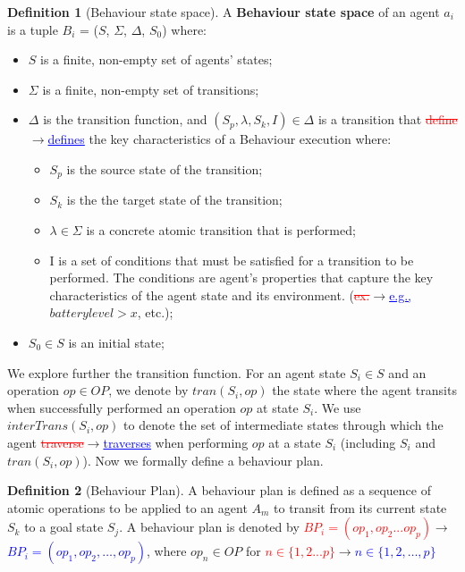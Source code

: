 \documentclass[journal]{IEEEtran}
\theoremstyle{definition}
\newtheorem{definition}{Definition}
\newcommand{\ra}{$\rightarrow$}
\newcommand{\chg}[2]{\textcolor{red}{\sout{#1}}{\ra}\textcolor{blue}{\uline{#2}}} %
\begin{document}
\begin{definition}[Behaviour state space]
A \textbf{Behaviour state space} of an agent $a_i$ is a tuple $B_i$ = ($S$, $\Sigma$, $\Delta $, $S_{0}$)  where: 
\begin{itemize}
\item $S$ is a finite, non-empty set of agents' states;
\item $\Sigma$ is a finite, non-empty set of transitions;
\item $ \Delta $ is the transition function,
and $(S_p,\lambda,S_k,I) \in \Delta $ is a transition
that \chg{define}{defines} the key characteristics of a Behaviour execution
where:
\begin{itemize}
\item  $S_p$ is the source state of the transition;
\item  $S_k$ is the the target state of the transition;
\item  $\lambda \in \Sigma$ is a concrete atomic transition that is performed;
\item I is a set of conditions that must be satisfied for a transition to be performed. The conditions are agent's properties that capture the key characteristics of the agent state and its environment.
(\chg{ex.}{e.g.,} $battery level > x$, etc.);
\end{itemize}
\item $S_{0} \in S$ is an initial state;
\end{itemize}
\end{definition}


We explore further the transition function. 
For an agent state $S_i \in S$ and an operation $ op \in  OP$, we denote by $tran(S_i,op )$ the state where the agent transits when successfully performed an operation $ op $ at state $S_i$. We use $ interTrans(S_i,op) $ to denote the set of intermediate states through which the agent \chg{traverse}{traverses} when performing $ op $ at a state $S_i$ (including $S_i$ and $tran(S_i,op)$). 
Now we formally define a behaviour plan.

\begin{definition}[Behaviour Plan]  A behaviour plan is defined as a sequence of atomic operations to be applied to an agent $A_m$ to transit from its current state $S_k$ to a goal state $S_j$.  A behaviour plan is denoted by \chg{$BP_i= (op_1, op_2 ... op_p)$}{$BP_i= (op_1, op_2, \dots, op_p)$}, where $op_n \in OP $ for 
\chg{$ n \in \{1,2 ... p\} $}{$ n \in \{1,2, \dots, p\} $}  
\end{definition}
\end{document}
